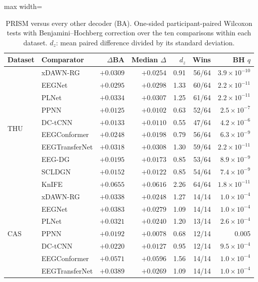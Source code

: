 \begin{table}[H]
\centering
\caption{PRISM versus every other decoder (BA). One-sided participant-paired Wilcoxon tests with Benjamini--Hochberg correction over the ten comparisons within each dataset. $d_z$: mean paired difference divided by its standard deviation.}
\label{tab:supp-benchmark-tests}
\footnotesize
\begin{adjustbox}{max width=\textwidth}
\begin{tabular}{@{}llrrrrr@{}}
\toprule
Dataset & Comparator & $\Delta$BA & Median $\Delta$ & $d_z$ & Wins & BH $q$ \\
\midrule
\multirow{10}{*}{THU} & xDAWN-RG & $+0.0309$ & $+0.0254$ & 0.91 & 56/64 & $3.9\times10^{-10}$ \\
 & EEGNet & $+0.0295$ & $+0.0298$ & 1.33 & 60/64 & $2.2\times10^{-11}$ \\
 & PLNet & $+0.0334$ & $+0.0307$ & 1.25 & 61/64 & $2.2\times10^{-11}$ \\
 & PPNN & $+0.0125$ & $+0.0102$ & 0.63 & 52/64 & $2.5\times10^{-7}$ \\
 & DC-tCNN & $+0.0133$ & $+0.0110$ & 0.55 & 47/64 & $4.2\times10^{-6}$ \\
 & EEGConformer & $+0.0248$ & $+0.0198$ & 0.79 & 56/64 & $6.3\times10^{-9}$ \\
 & EEGTransferNet & $+0.0318$ & $+0.0308$ & 1.30 & 59/64 & $2.2\times10^{-11}$ \\
 & EEG-DG & $+0.0195$ & $+0.0173$ & 0.85 & 53/64 & $8.9\times10^{-9}$ \\
 & SCLDGN & $+0.0152$ & $+0.0122$ & 0.85 & 54/64 & $7.4\times10^{-9}$ \\
 & KnIFE & $+0.0655$ & $+0.0616$ & 2.26 & 64/64 & $1.8\times10^{-11}$ \\
\midrule
\multirow{10}{*}{CAS} & xDAWN-RG & $+0.0338$ & $+0.0248$ & 1.27 & 14/14 & $1.0\times10^{-4}$ \\
 & EEGNet & $+0.0383$ & $+0.0279$ & 1.09 & 14/14 & $1.0\times10^{-4}$ \\
 & PLNet & $+0.0321$ & $+0.0240$ & 1.20 & 13/14 & $2.6\times10^{-4}$ \\
 & PPNN & $+0.0192$ & $+0.0078$ & 0.68 & 12/14 & 0.005 \\
 & DC-tCNN & $+0.0220$ & $+0.0127$ & 0.95 & 12/14 & $9.5\times10^{-4}$ \\
 & EEGConformer & $+0.0571$ & $+0.0596$ & 1.56 & 14/14 & $1.0\times10^{-4}$ \\
 & EEGTransferNet & $+0.0389$ & $+0.0269$ & 1.09 & 14/14 & $1.0\times10^{-4}$ \\

\end{tabular}
\end{adjustbox}
\end{table}

